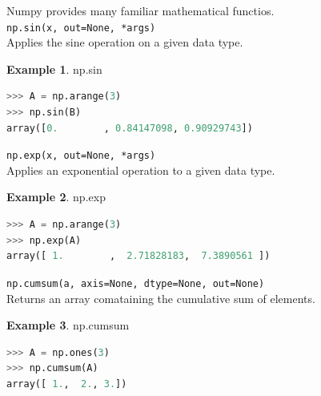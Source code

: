 \documentclass{article}
\theoremstyle{definition}
\newtheorem{ex}{Example}[subsection]
\theoremstyle{remark}
\newcommand{\func}[2]{\noindent\lstinline{#1}\\#2}
\begin{document}
Numpy provides many familiar mathematical functios.\\

\func{np.sin(x, out=None, *args)}{Applies the sine operation on a given data type.}

\begin{ex} np.sin
\begin{lstlisting}[language=Python]
>>> A = np.arange(3)
>>> np.sin(B)
array([0.        , 0.84147098, 0.90929743])
\end{lstlisting}
\end{ex}

\func{np.exp(x, out=None, *args)}{Applies an exponential operation to a given data type.}

\begin{ex} np.exp
\begin{lstlisting}[language=Python]
>>> A = np.arange(3)
>>> np.exp(A)
array([ 1.        ,  2.71828183,  7.3890561 ])
\end{lstlisting}
\end{ex}

\func{np.cumsum(a, axis=None, dtype=None, out=None)}{Returns an array comataining the cumulative sum of elements.}

\begin{ex} np.cumsum
\begin{lstlisting}[language=Python]
>>> A = np.ones(3)
>>> np.cumsum(A)
array([ 1.,  2., 3.])
\end{lstlisting}
\end{ex}
\end{document}
